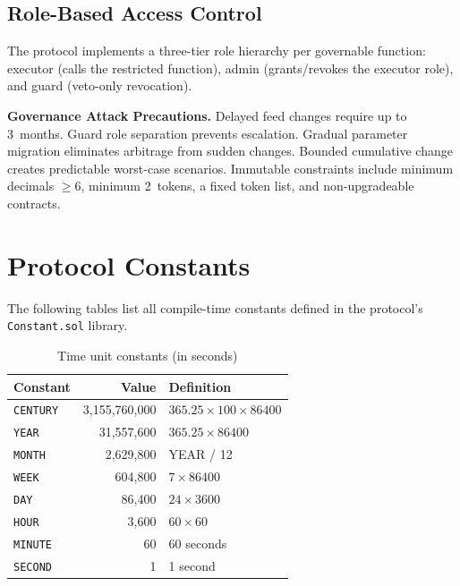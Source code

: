 \documentclass[10pt,a4paper,twocolumn]{article}
\theoremstyle{definition}
\theoremstyle{plain}
\theoremstyle{remark}
\begin{document}
\subsection{Role-Based Access Control}

The protocol implements a three-tier role hierarchy per governable function: executor (calls the restricted function), admin (grants/revokes the executor role), and guard (veto-only revocation).

\textbf{Governance Attack Precautions.} Delayed feed changes require up to 3~months. Guard role separation prevents escalation. Gradual parameter migration eliminates arbitrage from sudden changes. Bounded cumulative change creates predictable worst-case scenarios. Immutable constraints include minimum decimals $\geq 6$, minimum 2~tokens, a fixed token list, and non-upgradeable contracts.

\section{Protocol Constants}
\label{apx:constants}

The following tables list all compile-time constants defined in the protocol's \texttt{Constant.sol} library.

\begin{table}[H]
\centering
\caption{Time unit constants (in seconds)}
\label{tab:time-constants}
\small
\begin{tabularx}{0.95\columnwidth}{@{}l r X@{}}
\toprule
Constant & Value & Definition \\
\midrule
\texttt{CENTURY} & 3,155,760,000 & $365.25 \times 100 \times 86400$ \\
\texttt{YEAR} & 31,557,600 & $365.25 \times 86400$ \\
\texttt{MONTH} & 2,629,800 & YEAR / 12 \\
\texttt{WEEK} & 604,800 & $7 \times 86400$ \\
\texttt{DAY} & 86,400 & $24 \times 3600$ \\
\texttt{HOUR} & 3,600 & $60 \times 60$ \\
\texttt{MINUTE} & 60 & 60 seconds \\
\texttt{SECOND} & 1 & 1 second \\
\bottomrule
\end{tabularx}
\end{table}
\end{document}
